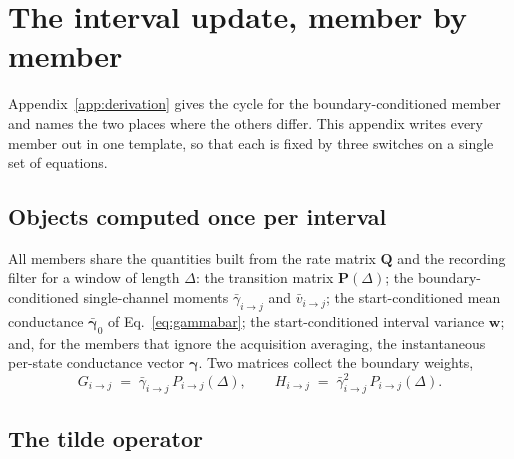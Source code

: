 \begin{appendixbox}
\label{app:members}
\section*{The interval update, member by member}

Appendix~\ref{app:derivation} gives the cycle for the boundary-conditioned member and names the two
places where the others differ. This appendix writes every member out in one template, so
that each is fixed by three switches on a single set of equations.

\subsection*{Objects computed once per interval}

All members share the quantities built from the rate matrix $\mathbf{Q}$ and the recording
filter for a window of length $\Delta$: the transition matrix $\mathbf{P}(\Delta)$; the
boundary-conditioned single-channel moments $\bar{\gamma}_{i\to j}$ and
$\bar{v}_{i\to j}$; the start-conditioned mean conductance $\bar{\boldsymbol{\gamma}}_0$ of
Eq.~\ref{eq:gammabar}; the start-conditioned interval variance
$\mathbf{w}$; and, for the members that ignore the acquisition
averaging, the instantaneous per-state conductance vector $\boldsymbol{\gamma}$. Two matrices
collect the boundary weights,
\begin{equation}
  G_{i\to j} \;=\; \bar{\gamma}_{i\to j}\,P_{i\to j}(\Delta),
  \qquad
  H_{i\to j} \;=\; \bar{\gamma}^2_{i\to j}\,P_{i\to j}(\Delta).
  \label{eq:GH}
\end{equation}

\subsection*{The tilde operator}


\end{appendixbox}
